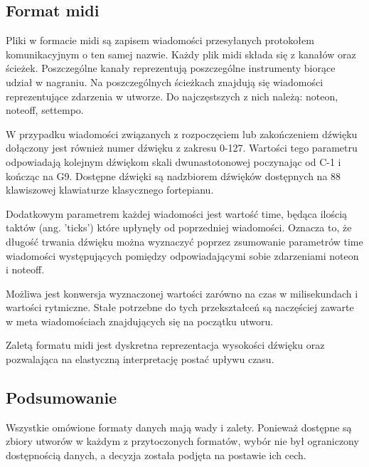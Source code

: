 {{        \subsection{Format midi}
        {
            Pliki w\,\,formacie midi są zapisem wiadomości przesyłanych protokołem komunikacyjnym o\,\,ten samej nazwie.
            Każdy plik midi składa się z\,\,kanałów oraz ścieżek. Poszczególne kanały reprezentują poszczególne instrumenty
            biorące udział w\,\,nagraniu. Na poszczególnych ścieżkach znajdują się wiadomości reprezentujące zdarzenia w\,\,utworze.
            Do najczęstszych z\,\,nich należą: note\textunderscore on, note\textunderscore off, set\textunderscore tempo.

            W\,\,przypadku wiadomości związanych z\,\,rozpoczęciem lub zakończeniem
            dźwięku dołączony jest również numer dźwięku z\,\,zakresu 0-127. 
            Wartości tego parametru odpowiadają kolejnym dźwiękom skali dwunastotonowej poczynając od C-1 i\,\,kończąc na G9.
            Dostępne dźwięki są nadzbiorem dźwięków dostępnych na 88 klawiszowej klawiaturze klasycznego fortepianu.

            Dodatkowym parametrem każdej wiadomości jest wartość time, będąca ilością taktów (ang. 'ticks') które upłynęły
            od poprzedniej wiadomości. Oznacza to, że długość trwania dźwięku można wyznaczyć poprzez zsumowanie parametrów time
            wiadomości występujących pomiędzy odpowiadającymi sobie zdarzeniami note\textunderscore on i\,\,note\textunderscore off.

            Możliwa jest konwersja wyznaczonej wartości zarówno na czas w\,\,milisekundach i\,\,wartości rytmiczne.
            Stałe potrzebne do tych przekształceń są naczęściej zawarte w\,\,meta wiadomościach znajdujących się na początku utworu.

            Zaletą formatu midi jest dyskretna reprezentacja wysokości dźwięku oraz pozwalająca na elastyczną 
            interpretację postać upływu czasu.
        }

        \subsection{Podsumowanie}
        {

            Wszystkie omówione formaty danych mają wady i\,\,zalety. 
            Ponieważ dostępne są zbiory utworów w\,\,każdym z\,\,przytoczonych formatów, wybór nie był ograniczony dostępnością danych, 
            a\,\,decyzja została podjęta na postawie ich cech.
            
}}}
